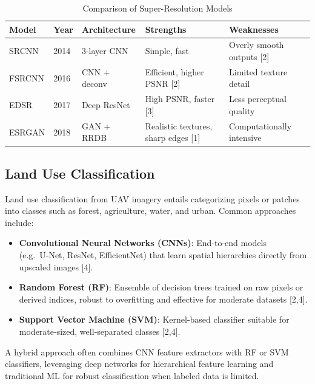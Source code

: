 \begin{table}[H]
\centering
\renewcommand{\arraystretch}{1.2}
\setlength{\tabcolsep}{6pt}
\begin{tabular}{@{} l l p{3cm} p{3cm} p{3cm} @{}}
    \toprule
    \textbf{Model} & \textbf{Year} & \textbf{Architecture} & \textbf{Strengths} & \textbf{Weaknesses} \\
    \midrule
    SRCNN   & 2014 & 3-layer CNN & Simple, fast & Overly smooth outputs [2] \\
    FSRCNN  & 2016 & CNN + deconv & Efficient, higher PSNR [2] & Limited texture detail \\
    EDSR    & 2017 & Deep ResNet & High PSNR, faster [3] & Less perceptual quality \\
    ESRGAN  & 2018 & GAN + RRDB & Realistic textures, sharp edges [1] & Computationally intensive \\
    \bottomrule
  \end{tabular}
  \caption{Comparison of Super-Resolution Models}
\label{tab:sr_models}
\end{table}


\subsection{Land Use Classification}
Land use classification from UAV imagery entails categorizing pixels or patches into classes such as forest, agriculture, water, and urban. Common approaches include:
\begin{itemize}
  \item \textbf{Convolutional Neural Networks (CNNs)}: End‑to‑end models (e.g.\ U‑Net, ResNet, EfficientNet) that learn spatial hierarchies directly from upscaled images [4].
  \item \textbf{Random Forest (RF)}: Ensemble of decision trees trained on raw pixels or derived indices, robust to overfitting and effective for moderate datasets [2,4].
  \item \textbf{Support Vector Machine (SVM)}: Kernel‑based classifier suitable for moderate‑sized, well‑separated classes [2,4].
\end{itemize}
A hybrid approach often combines CNN feature extractors with RF or SVM classifiers, leveraging deep networks for hierarchical feature learning and traditional ML for robust classification when labeled data is limited.

